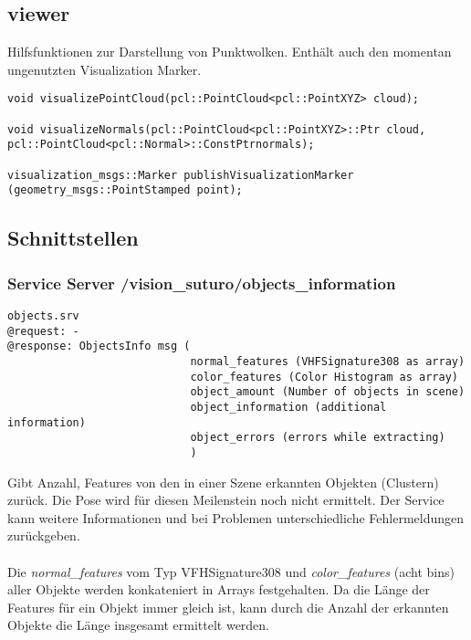 \documentclass{suturo}
\begin{document}
\subsection*{viewer}
Hilfsfunktionen zur Darstellung von Punktwolken.
Enthält auch den momentan ungenutzten Visualization Marker.

\begin{verbatim}
void visualizePointCloud(pcl::PointCloud<pcl::PointXYZ> cloud);

void visualizeNormals(pcl::PointCloud<pcl::PointXYZ>::Ptr cloud,
pcl::PointCloud<pcl::Normal>::ConstPtrnormals);

visualization_msgs::Marker publishVisualizationMarker
(geometry_msgs::PointStamped point);
\end{verbatim}


\subsection{Schnittstellen}

\subsubsection{Service Server /vision\_suturo/objects\_information}
\begin{verbatim}
objects.srv
@request: -
@response: ObjectsInfo msg (
							normal_features (VHFSignature308 as array)
							color_features (Color Histogram as array)
							object_amount (Number of objects in scene)
							object_information (additional information)
							object_errors (errors while extracting)
							)
\end{verbatim}
Gibt Anzahl, Features von den in einer Szene erkannten Objekten (Clustern) zurück. Die Pose wird für diesen Meilenstein noch nicht ermittelt. Der Service kann weitere Informationen und bei Problemen unterschiedliche Fehlermeldungen zurückgeben.
\\ \\
Die \textit{normal\_features} vom Typ VFHSignature308 und \textit{color\_features} (acht bins) aller Objekte werden konkateniert in Arrays festgehalten. 
Da die Länge der Features für ein Objekt immer gleich ist, kann durch die Anzahl der erkannten Objekte die Länge insgesamt ermittelt werden.
\end{document}
